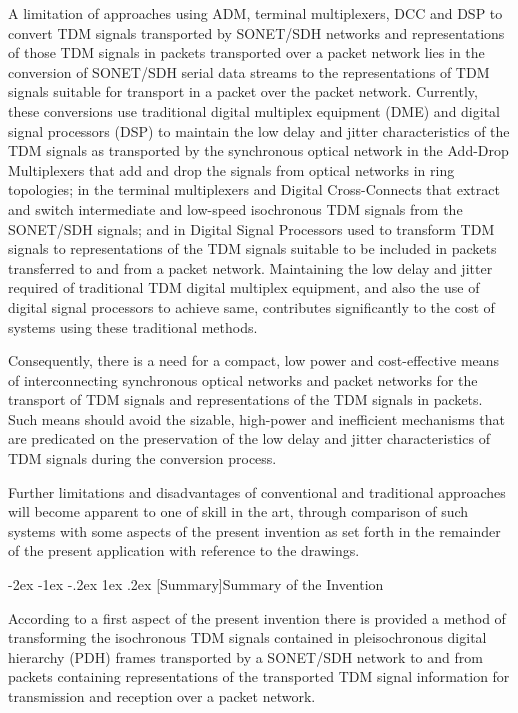 \documentclass[letterpaper,final,notitlepage,twocolumn,10pt,twoside]{article}
\makeatletter
\let\large = \normalsize
\let\normalsize = \small
\let\small = \footnotesize
\let\footnotesize = \scriptsize
\let\scriptsize = \tiny
\renewcommand\section{\@startsection {section}{1}{\z@}%
                                   {-2ex \@plus -1ex \@minus -.2ex}%
                                   {1ex \@plus .2ex}%
                                   {\normalfont\large\bfseries}}
\makeatother
\begin{document}
A limitation of approaches using ADM, terminal multiplexers, DCC and DSP to
convert TDM signals transported by SONET/SDH networks and representations of
those TDM signals in packets transported over a packet network lies in the
conversion of SONET/SDH serial data streams to the representations of TDM
signals suitable for transport in a packet over the packet network.
Currently, these conversions use traditional digital multiplex equipment (DME)
and digital signal processors (DSP) to maintain the low delay and jitter
characteristics of the TDM signals as transported by the synchronous optical
network in the Add-Drop Multiplexers that add and drop the signals from
optical networks in ring topologies; in the terminal multiplexers and Digital
Cross-Connects that extract and switch intermediate and low-speed isochronous
TDM signals from the SONET/SDH signals; and in Digital Signal Processors used
to transform TDM signals to representations of the TDM signals suitable to be
included in packets transferred to and from a packet network.  Maintaining the
low delay and jitter required of traditional TDM digital multiplex equipment,
and also the use of digital signal processors to achieve same, contributes
significantly to the cost of systems using these traditional methods.

Consequently, there is a need for a compact, low power and cost-effective
means of interconnecting synchronous optical networks and packet networks for
the transport of TDM signals and representations of the TDM signals in packets.
Such means should avoid the sizable, high-power and inefficient mechanisms
that are predicated on the preservation of the low delay and jitter
characteristics of TDM signals during the conversion process.

Further limitations and disadvantages of conventional and traditional
approaches will become apparent to one of skill in the art, through comparison
of such systems with some aspects of the present invention as set forth in the
remainder of the present application with reference to the drawings.

\section[Summary]{Summary of the Invention}

According to a first aspect of the present invention there is provided a
method of transforming the isochronous TDM signals contained in pleisochronous
digital hierarchy (PDH) frames transported by a SONET/SDH network to and from
packets containing representations of the transported TDM signal information
for transmission and reception over a packet network.
\end{document}
